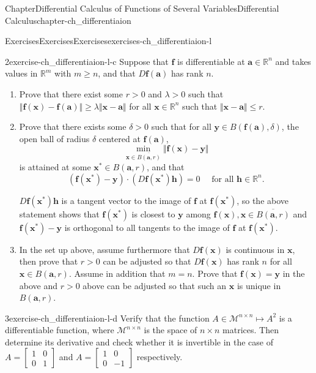 \documentclass[oneside,10pt,]{book}
\numberwithin{equation}{section}
\newcommand{\ba}{\mathbf{a}}
\newcommand{\bff}{\mathbf{f}}
\newcommand{\bh}{\mathbf{h}}
\newcommand{\bx}{\mathbf{x}}
\newcommand{\by}{\mathbf{y}}
\newcommand{\bbR}{\mathbb{R}}
\newcommand{\cM}{\mathcal{M}}
\newcommand{\amp}{&}
\begin{document}
\begin{chapterptx}{Chapter}{Differential Calculus of Functions of Several Variables}{}{Differential Calculus}{}{}{chapter-ch_differentiaion}
\begin{exercises-section}{Exercises}{Exercises}{}{Exercises}{}{}{exercises-ch_differentiaion-l}
\begin{divisionexercise}{2}{}{}{exercise-ch_differentiaion-l-c}
Suppose that \(\bff\) is differentiable at \(\ba \in \bbR^{n}\) and takes values in \(\bbR^{m}\) with \(m\ge n\), and that \(D\bff (\ba)\) has rank \(n\).%
\begin{enumerate}[label=(\alph*).]
\item{}Prove that there exist some \(r >0\) and \(\lambda > 0\) such that \(\Vert \bff (\bx) -\bff (\ba)\Vert \ge \lambda \Vert \bx -\ba \Vert \) for all \(\bx\in \bbR^{n}\) such that \(\Vert \bx -\ba \Vert \le r\).%
\item{}Prove that there exists some \(\delta >0\) such that for all \(\by \in B(\bff(\ba), \delta)\), the open ball of radius \(\delta\) centered at \(\bff(\ba)\),%
\begin{equation*}
\min_{\bx\in \overline{B(\ba, r)}} \Vert \bff (\bx) - \by \Vert
\end{equation*}
is attained at some \(\bx^{*} \in B(\ba, r)\), and that%
\begin{equation*}
\left( \bff (\bx^{*}) - \by\right)\cdot \left( D\bff(\bx^{*})\bh \right)=0 \quad \text{ for all $\bh \in \bbR^{n}$.}
\end{equation*}
%
\par
\(D\bff(\bx^{*})\bh\) is a tangent vector to the image of \(\bff\) at \(\bff(\bx^{*})\), so the above statement shows that \(\bff(\bx^{*})\) is closest to \(\by\) among \(\bff(\bx), \bx\in \overline{B(\ba, r)}\) and \(\bff (\bx^{*}) - \by\) is orthogonal to all tangents to the image of \(\bff\) at \(\bff(\bx^{*})\).%
\item{}In the set up above, assume furthermore that \(D\bff(\bx)\) is continuous in \(\bx\), then prove that \(r>0\)  can be adjusted so that \(D\bff(\bx)\) has rank \(n\) for all \(\bx \in B(\ba, r)\). Assume in addition that \(m=n\). Prove that \(\bff (\bx)=\by\) in the above and \(r>0\) above can be adjusted so that such an \(\bx\) is unique in \(B(\ba, r)\).%
\end{enumerate}
%
\end{divisionexercise}%
\begin{divisionexercise}{3}{}{}{exercise-ch_differentiaion-l-d}%
Verify that the function \(A\in \cM^{n\times n} \mapsto A^{2}\) is a differentiable function, where \(\cM^{n\times n}\) is the space of \(n\times n\) matrices. Then determine its derivative and check whether it is invertible in the case of \(A=\begin{bmatrix} 1 \amp 0 \\ 0 \amp 1\end{bmatrix}\) and \(A=\begin{bmatrix} 1 \amp 0 \\ 0 \amp -1\end{bmatrix}\) respectively.%

\end{divisionexercise}
\end{exercises-section}
\end{chapterptx}
\end{document}
